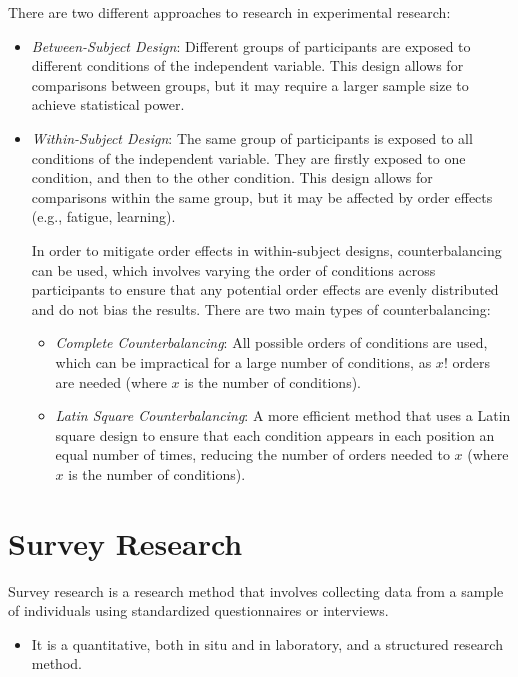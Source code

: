 There are two different approaches to research in experimental research:
\begin{itemize}
    \item \emph{Between-Subject Design}: Different groups of participants are exposed to different conditions of the independent variable. This design allows for comparisons between groups, but it may require a larger sample size to achieve statistical power.
    \item \emph{Within-Subject Design}: The same group of participants is exposed to all conditions of the independent variable. They are firstly exposed to one condition, and then to the other condition. This design allows for comparisons within the same group, but it may be affected by order effects (e.g., fatigue, learning).
    
    In order to mitigate order effects in within-subject designs, counterbalancing can be used, which involves varying the order of conditions across participants to ensure that any potential order effects are evenly distributed and do not bias the results. There are two main types of counterbalancing:
    \begin{itemize}
        \item \emph{Complete Counterbalancing}: All possible orders of conditions are used, which can be impractical for a large number of conditions, as $x!$ orders are needed (where $x$ is the number of conditions).
        \item \emph{Latin Square Counterbalancing}: A more efficient method that uses a Latin square design to ensure that each condition appears in each position an equal number of times, reducing the number of orders needed to $x$ (where $x$ is the number of conditions).
    \end{itemize}
\end{itemize}


\section{Survey Research}

Survey research is a research method that involves collecting data from a sample of individuals using standardized questionnaires or interviews.
\begin{itemize}
    \item It is a quantitative, both in situ and in laboratory, and a structured research method.
\end{itemize}

